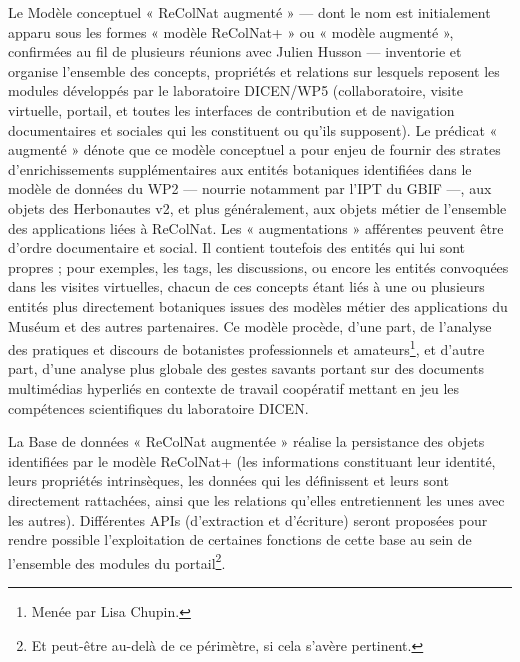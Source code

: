 \startchapter[title={Terminologie}]

\startsection[title={Le modèle « RecolNat+ »}]

Le Modèle conceptuel « ReColNat augmenté » --- dont le nom est initialement apparu sous les formes « modèle ReColNat+ » ou « modèle augmenté », confirmées au fil de plusieurs réunions avec Julien Husson --- inventorie et organise l'ensemble des concepts, propriétés et relations sur lesquels reposent les modules développés par le laboratoire DICEN/WP5 (collaboratoire, visite virtuelle, portail, et toutes les interfaces de contribution et de navigation documentaires et sociales qui les constituent ou qu'ils supposent).
Le prédicat « augmenté » dénote que ce modèle conceptuel a pour enjeu de fournir des strates d'enrichissements supplémentaires aux entités botaniques identifiées dans le modèle de données du WP2 --- nourrie notamment par l'IPT du GBIF ---, aux objets des Herbonautes v2, et plus généralement, aux objets métier de l'ensemble des applications liées à ReColNat.
Les « augmentations » afférentes peuvent être d'ordre documentaire et social.
Il contient toutefois des entités qui lui sont propres ; pour exemples, les tags, les discussions, ou encore les entités convoquées dans les visites virtuelles, chacun de ces concepts étant liés à une ou plusieurs entités plus directement botaniques issues des modèles métier des applications du Muséum et des autres partenaires.
Ce modèle procède, d'une part, de l'analyse des pratiques et discours de botanistes professionnels et amateurs\footnote{Menée par Lisa Chupin.}, et d'autre part, d'une analyse plus globale des gestes savants portant sur des documents multimédias hyperliés en contexte de travail coopératif mettant en jeu les compétences scientifiques du laboratoire DICEN.

\stopsection
\startsection[title={La base « ReColNat+ »},reference=terme:base]

La Base de données « ReColNat augmentée » réalise la persistance des objets identifiées par le modèle ReColNat+ (les informations constituant leur identité, leurs propriétés intrinsèques, les données qui les définissent et leurs sont directement rattachées, ainsi que les relations qu'elles entretiennent les unes avec les autres).
Différentes APIs (d'extraction et d'écriture) seront proposées pour rendre possible l'exploitation de certaines fonctions de cette base au sein de l'ensemble des modules du portail\footnote{Et peut-être au-delà de ce périmètre, si cela s'avère pertinent.}.

\stopsection
\stopchapter